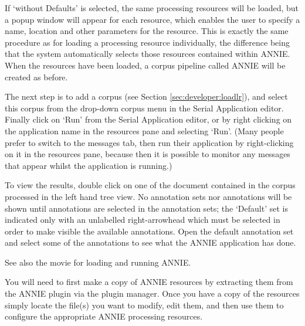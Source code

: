 If `without Defaults' is selected, the same processing resources
will be loaded, but a popup window will appear for each resource,
which enables the user to specify a name, location and other parameters
for the resource. This is exactly the same procedure as for loading a
processing resource individually, the difference being that the
system automatically selects those resources contained within
ANNIE. When the resources have been loaded, a corpus pipeline called
ANNIE will be created as before.

The next step is to add a corpus (see Section \ref{sec:developer:loadlr}), and
select this corpus from the drop-down corpus menu in the Serial Application
editor. Finally click on `Run' from the Serial Application editor, or by right
clicking on the application name in the resources pane and selecting `Run'.
(Many people prefer to switch to the messages tab, then run their application
by right-clicking on it in the resources pane, because then it is possible to
monitor any messages that appear whilst the application is running.)

To view the results, double click on one of the document contained in the
corpus processed in the left hand tree view. No annotation sets nor
annotations will be shown until annotations are selected in
the annotation sets; the `Default' set is indicated only with an unlabelled
right-arrowhead which must be selected in order to make visible the available
annotations. Open the default annotation set and select some of the annotations
to see what the ANNIE application has done.

See also the 
{movie for loading and running ANNIE}.


You will need to first make a copy of ANNIE resources by extracting them from the
ANNIE plugin via the plugin manager. Once you have a copy of the resources simply
locate the file(s) you want to modify, edit them, and then use them to configure
the appropriate ANNIE processing resources.


